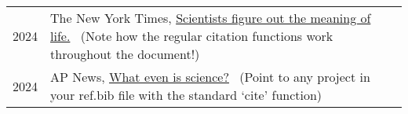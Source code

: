 % 
\begin{longtable}[l]{@{}p{} p{}}

    2024 & The New York Times, \href{https://nyt.com}{Scientists figure out the meaning of life.}~\cite{art1} (Note how the regular citation functions work throughout the document!) \\
    
    2024 & AP News, \href{https://apnews.com/}{What even is science?}~\cite{art2} (Point to any project in your ref.bib file with the standard `cite' function) \\

    
\end{longtable}

